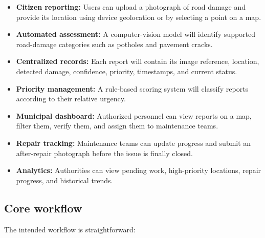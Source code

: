 \documentclass[11pt,a4paper]{article}
\begin{document}
\begin{itemize}[leftmargin=0.6cm]

    \item \textbf{Citizen reporting:} Users can upload a photograph of road damage and provide its location using device geolocation or by selecting a point on a map.

    \item \textbf{Automated assessment:} A computer-vision model will identify supported road-damage categories such as potholes and pavement cracks.

    \item \textbf{Centralized records:} Each report will contain its image reference, location, detected damage, confidence, priority, timestamps, and current status.

    \item \textbf{Priority management:} A rule-based scoring system will classify reports according to their relative urgency.

    \item \textbf{Municipal dashboard:} Authorized personnel can view reports on a map, filter them, verify them, and assign them to maintenance teams.

    \item \textbf{Repair tracking:} Maintenance teams can update progress and submit an after-repair photograph before the issue is finally closed.

    \item \textbf{Analytics:} Authorities can view pending work, high-priority locations, repair progress, and historical trends.

\end{itemize}

\subsection{Core workflow}

The intended workflow is straightforward:
\end{document}
